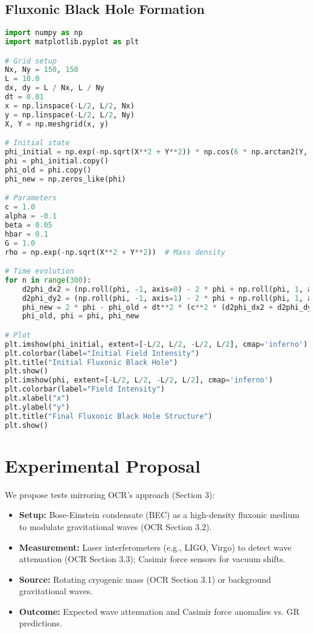 \documentclass{article}
\begin{document}
\subsection{Fluxonic Black Hole Formation}
\begin{lstlisting}[language=Python, caption=Fluxonic Black Hole Formation, label=lst:blackhole]
import numpy as np
import matplotlib.pyplot as plt

# Grid setup
Nx, Ny = 150, 150
L = 10.0
dx, dy = L / Nx, L / Ny
dt = 0.01
x = np.linspace(-L/2, L/2, Nx)
y = np.linspace(-L/2, L/2, Ny)
X, Y = np.meshgrid(x, y)

# Initial state
phi_initial = np.exp(-np.sqrt(X**2 + Y**2)) * np.cos(6 * np.arctan2(Y, X))
phi = phi_initial.copy()
phi_old = phi.copy()
phi_new = np.zeros_like(phi)

# Parameters
c = 1.0
alpha = -0.1
beta = 0.05
hbar = 0.1
G = 1.0
rho = np.exp(-np.sqrt(X**2 + Y**2))  # Mass density

# Time evolution
for n in range(300):
    d2phi_dx2 = (np.roll(phi, -1, axis=0) - 2 * phi + np.roll(phi, 1, axis=0)) / dx**2
    d2phi_dy2 = (np.roll(phi, -1, axis=1) - 2 * phi + np.roll(phi, 1, axis=1)) / dy**2
    phi_new = 2 * phi - phi_old + dt**2 * (c**2 * (d2phi_dx2 + d2phi_dy2) + alpha * phi + beta * phi**3 - hbar * (phi - phi_old) / dt + 8 * np.pi * G * rho)
    phi_old, phi = phi, phi_new

# Plot
plt.imshow(phi_initial, extent=[-L/2, L/2, -L/2, L/2], cmap='inferno')
plt.colorbar(label="Initial Field Intensity")
plt.title("Initial Fluxonic Black Hole")
plt.show()
plt.imshow(phi, extent=[-L/2, L/2, -L/2, L/2], cmap='inferno')
plt.colorbar(label="Field Intensity")
plt.xlabel("x")
plt.ylabel("y")
plt.title("Final Fluxonic Black Hole Structure")
plt.show()
\end{lstlisting}

\section{Experimental Proposal}
We propose tests mirroring OCR’s approach (Section 3):
\begin{itemize}
    \item \textbf{Setup:} Bose-Einstein condensate (BEC) as a high-density fluxonic medium to modulate gravitational waves (OCR Section 3.2).
    \item \textbf{Measurement:} Laser interferometers (e.g., LIGO, Virgo) to detect wave attenuation (OCR Section 3.3); Casimir force sensors for vacuum shifts.
    \item \textbf{Source:} Rotating cryogenic mass (OCR Section 3.1) or background gravitational waves.
    \item \textbf{Outcome:} Expected wave attenuation and Casimir force anomalies vs. GR predictions.
\end{itemize}
\end{document}
